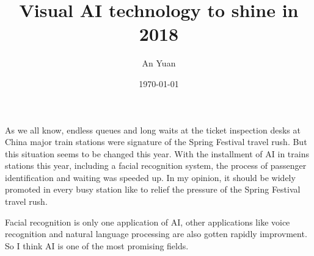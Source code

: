 \documentclass[a4paper,12pt]{article}
\begin{document}
\title{Visual AI technology to shine in 2018}
\author{An Yuan}
\date{\today}
\maketitle
As we all know, endless queues and long waits at the ticket inspection desks at China major train stations were signature of the Spring Festival travel rush. But this situation seems to be changed this year. With the installment of AI in trains stations this year, including a facial recognition system, the process of passenger identification and waiting was speeded up. In my opinion, it should be widely promoted in every busy station like to relief the pressure of the Spring Festival travel rush. 
\par
Facial recognition is only one application of AI, other applications like voice recognition and natural language processing are also gotten rapidly improvment. So I think AI is one of the most promising fields.  
\end{document}
